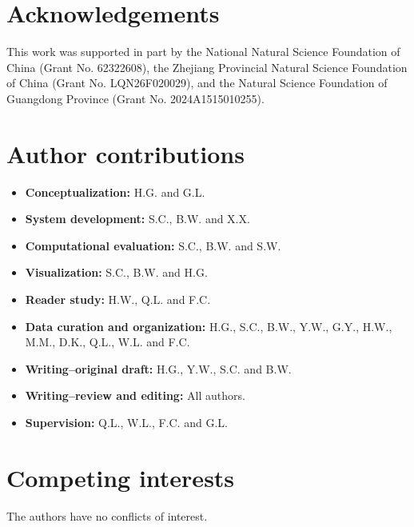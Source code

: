 \documentclass[fleqn,10pt]{wlscirep}
\begin{document}
\section{Acknowledgements}
This work was supported in part by the National Natural Science Foundation of China (Grant No. 62322608), the Zhejiang Provincial Natural Science Foundation of China (Grant No. LQN26F020029), and the Natural Science Foundation of Guangdong Province (Grant No. 2024A1515010255).


\section{Author contributions}

\begin{itemize}
    \item \textbf{Conceptualization:} H.G. and G.L.
    \item \textbf{System development:} S.C., B.W. and X.X.
    \item \textbf{Computational evaluation:} S.C., B.W. and S.W.
    \item \textbf{Visualization:} S.C., B.W. and H.G.

    \item \textbf{Reader study:} H.W., Q.L. and F.C.
    \item \textbf{Data curation and organization:} H.G., S.C., B.W., Y.W., G.Y., H.W., M.M., D.K., Q.L., W.L. and F.C.
    \item \textbf{Writing--original draft:} H.G., Y.W., S.C. and B.W.
    \item \textbf{Writing--review and editing:} All authors.
    \item \textbf{Supervision:} Q.L., W.L., F.C. and G.L.
\end{itemize}

\section{Competing interests}
The authors have no conflicts of interest.
\end{document}
